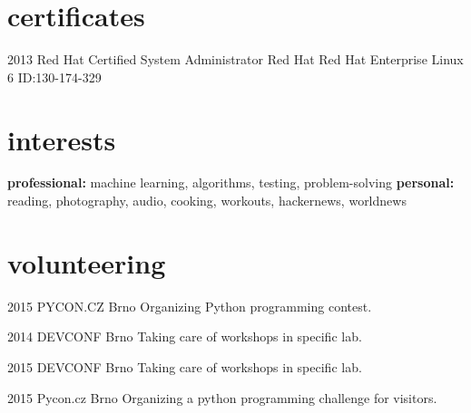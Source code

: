 \documentclass[]{friggeri-cv} %
\begin{document}
\section{certificates}

\begin{entrylist}


\entry
{2013}
{Red Hat Certified System Administrator}
{Red Hat}
{Red Hat Enterprise Linux 6 ID:130-174-329}


\end{entrylist}


\section{interests}

\textbf{professional:} machine learning, algorithms, testing, problem-solving \textbf{personal:} reading, photography, audio, cooking, workouts, hackernews, worldnews


\section{volunteering}

\begin{entrylist}

\entry
{2015}
{PYCON.CZ}
{Brno}
{Organizing Python programming contest.}

\entry
{2014}
{DEVCONF}
{Brno}
{Taking care of workshops in specific lab.}

\entry
{2015}
{DEVCONF}
{Brno}
{Taking care of workshops in specific lab.}

\entry
{2015}
{Pycon.cz}
{Brno}
{Organizing a python programming challenge for visitors.}
\end{entrylist}

\end{document}
